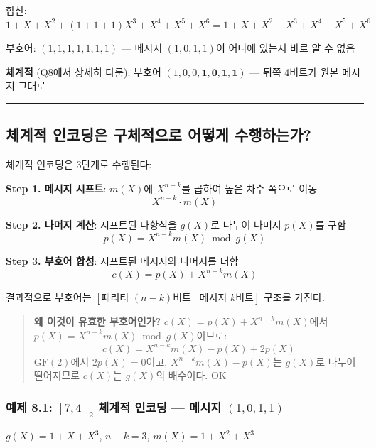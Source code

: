 \documentclass[
  oneside]{article}
\begin{document}
합산:
\(1 + X + X^2 + (1+1+1)X^3 + X^4 + X^5 + X^6 = 1 + X + X^2 + X^3 + X^4 + X^5 + X^6\)

부호어: \((1, 1, 1, 1, 1, 1, 1)\) --- 메시지 \((1, 0, 1, 1)\)이 어디에
있는지 바로 알 수 없음

\textbf{체계적} (Q8에서 상세히 다룸): 부호어
\((1, 0, 0, \mathbf{1, 0, 1, 1})\) --- 뒤쪽 4비트가 원본 메시지 그대로

\begin{center}\rule{0.5\linewidth}{0.5pt}\end{center}

\subsection{체계적 인코딩은 구체적으로 어떻게
수행하는가?}\label{uxccb4uxacc4uxc801-uxc778uxcf54uxb529uxc740-uxad6cuxccb4uxc801uxc73cuxb85c-uxc5b4uxb5bbuxac8c-uxc218uxd589uxd558uxb294uxac00}

체계적 인코딩은 3단계로 수행된다:

\textbf{Step 1. 메시지 시프트}: \(m(X)\)에 \(X^{n-k}\)를 곱하여 높은
차수 쪽으로 이동 \[X^{n-k} \cdot m(X)\]

\textbf{Step 2. 나머지 계산}: 시프트된 다항식을 \(g(X)\)로 나누어 나머지
\(p(X)\)를 구함 \[p(X) = X^{n-k} m(X) \bmod g(X)\]

\textbf{Step 3. 부호어 합성}: 시프트된 메시지와 나머지를 더함
\[c(X) = p(X) + X^{n-k} m(X)\]

결과적으로 부호어는
\([\text{패리티 } (n-k) \text{비트} \mid \text{메시지 } k \text{비트}]\)
구조를 가진다.

\begin{quote}
\textbf{왜 이것이 유효한 부호어인가?} \(c(X) = p(X) + X^{n-k}m(X)\)에서
\(p(X) = X^{n-k}m(X) \bmod g(X)\)이므로:
\[c(X) = X^{n-k}m(X) - p(X) + 2p(X)\] \(\text{GF}(2)\)에서
\(2p(X) = 0\)이고, \(X^{n-k}m(X) - p(X)\)는 \(g(X)\)로 나누어 떨어지므로
\(c(X)\)는 \(g(X)\)의 배수이다. OK
\end{quote}

\subsubsection{\texorpdfstring{예제 8.1: \([7, 4]_2\) 체계적 인코딩 ---
메시지
\((1, 0, 1, 1)\)}{예제 8.1: {[}7, 4{]}\_2 체계적 인코딩 --- 메시지 (1, 0, 1, 1)}}\label{uxc608uxc81c-8.1-7-4_2-uxccb4uxacc4uxc801-uxc778uxcf54uxb529-uxba54uxc2dcuxc9c0-1-0-1-1}

\(g(X) = 1 + X + X^3\), \(n-k = 3\), \(m(X) = 1 + X^2 + X^3\)
\end{document}
